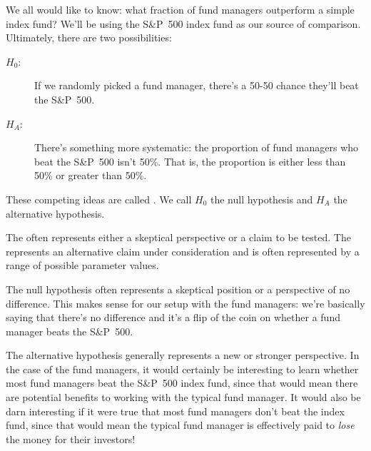 We all would like to know: what fraction of fund managers
outperform a simple index fund? We'll be using the S\&P~500
index fund as our source of comparison.
Ultimately, there are two possibilities:
\begin{description}
\item[$H_0$:] %
  If we randomly picked a fund manager, there's a 50-50 chance
  they'll beat the S\&P~500.
\item[$H_A$:] %
  There's something more systematic: the proportion of fund
  managers who beat the S\&P~500 isn't 50\%. That is, the
  proportion is either less than 50\% or greater than 50\%.
\end{description}
These competing ideas are called .
We call $H_0$ the null hypothesis and $H_A$ the alternative
hypothesis.

\begin{termBox}{
  The  often represents
  either a skeptical perspective or a claim to be tested.
  The  represents an
  alternative claim under consideration and is often
  represented by a range of possible parameter values.}
\end{termBox}

The null hypothesis often represents a skeptical position
or a perspective of no difference. This makes sense for our
setup with the fund managers: we're basically saying that
there's no difference and it's a flip of the coin on whether
a fund manager beats the S\&P~500.

The alternative hypothesis generally represents a new
or stronger perspective. In the case of the fund managers,
it would certainly be interesting to learn whether most fund
managers beat the S\&P~500 index fund, since that would mean
there are potential benefits to working with the typical fund
manager. It would also be darn interesting if it were true
that most fund managers don't beat the index fund, since
that would mean the typical fund manager is effectively paid
to \emph{lose} the money for their investors!

